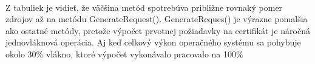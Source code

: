 \documentclass[
  printed, %
  table,   %
oneside,
  nolof,     %
  nolot,     %
]{fithesis3}
\begin{document}
\begin{table}[htbp]
	\begin{center}
	\end{center}
	\caption{Ukážka nameraných hodnôt}
	\label{table:1000}
\end{table}

\paragraph{}
Z tabuliek je vidieť, že väčšina metód spotrebúva približne rovnaký pomer zdrojov až na metódu GenerateRequest().  GenerateReques() je výrazne pomalšia ako ostatné metódy, pretože výpočet prvotnej požiadavky na certifikát je náročná jednovláknová operácia. Aj keď celkový výkon operačného systému sa pohybuje okolo 30\% vlákno, ktoré výpočet vykonávalo pracovalo na 100\% 
\end{document}

